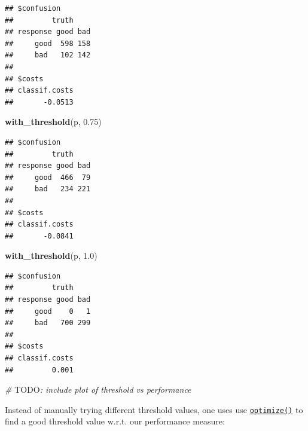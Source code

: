 \documentclass[]{scrbook}
\newenvironment{Shaded}{\begin{snugshade}}{\end{snugshade}}
\newcommand{\AlertTok}[1]{\textcolor[rgb]{0.94,0.16,0.16}{#1}}
\newcommand{\CommentTok}[1]{\textcolor[rgb]{0.56,0.35,0.01}{\textit{#1}}}
\newcommand{\ControlFlowTok}[1]{\textcolor[rgb]{0.13,0.29,0.53}{\textbf{#1}}}
\newcommand{\DecValTok}[1]{\textcolor[rgb]{0.00,0.00,0.81}{#1}}
\newcommand{\FloatTok}[1]{\textcolor[rgb]{0.00,0.00,0.81}{#1}}
\newcommand{\KeywordTok}[1]{\textcolor[rgb]{0.13,0.29,0.53}{\textbf{#1}}}
\newcommand{\NormalTok}[1]{#1}
\newcommand{\OperatorTok}[1]{\textcolor[rgb]{0.81,0.36,0.00}{\textbf{#1}}}
\newcommand{\StringTok}[1]{\textcolor[rgb]{0.31,0.60,0.02}{#1}}
\renewenvironment{Shaded} {\begin{snugshade}\small} {\end{snugshade}}
\begin{document}
\begin{verbatim}
## $confusion
##         truth
## response good bad
##     good  598 158
##     bad   102 142
## 
## $costs
## classif.costs 
##       -0.0513
\end{verbatim}

\begin{Shaded}
\begin{Highlighting}[]
\KeywordTok{with_threshold}\NormalTok{(p, }\FloatTok{0.75}\NormalTok{)}
\end{Highlighting}
\end{Shaded}

\begin{verbatim}
## $confusion
##         truth
## response good bad
##     good  466  79
##     bad   234 221
## 
## $costs
## classif.costs 
##       -0.0841
\end{verbatim}

\begin{Shaded}
\begin{Highlighting}[]
\KeywordTok{with_threshold}\NormalTok{(p, }\FloatTok{1.0}\NormalTok{)}
\end{Highlighting}
\end{Shaded}

\begin{verbatim}
## $confusion
##         truth
## response good bad
##     good    0   1
##     bad   700 299
## 
## $costs
## classif.costs 
##         0.001
\end{verbatim}

\begin{Shaded}
\begin{Highlighting}[]
\CommentTok{# }\AlertTok{TODO}\CommentTok{: include plot of threshold vs performance}
\end{Highlighting}
\end{Shaded}

Instead of manually trying different threshold values, one uses use \href{https://www.rdocumentation.org/packages/stats/topics/optimize}{\texttt{optimize()}} to find a good threshold value w.r.t. our performance measure:

\begin{Shaded}
\end{Shaded}
\end{document}
